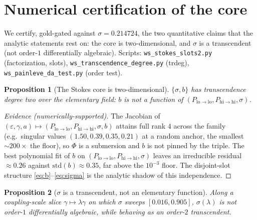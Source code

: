 \documentclass[11pt]{article}
\newtheorem{proposition}{Proposition}
\theoremstyle{definition}
\theoremstyle{remark}
\newcommand{\eps}{\varepsilon}
\newcommand{\lo}{\mathrm{lo}}
\newcommand{\hi}{\mathrm{hi}}
\begin{document}
\section{Numerical certification of the core}\label{sec:cert}

We certify, gold-gated against $\sigma=0.214724$, the two quantitative claims that the
analytic statements rest on: the core is two-dimensional, and $\sigma$ is a transcendent (not
order-$1$ differentially algebraic). Scripts: \texttt{ws\_stokes\_slots2.py} (factorization,
slots), \texttt{ws\_transcendence\_degree.py} (trdeg), \texttt{ws\_painleve\_da\_test.py}
(order test).

\begin{proposition}[The Stokes core is two-dimensional]\label{prop:trdeg}
$\{\sigma,b\}$ has transcendence degree two over the elementary field: $b$ is not a function
of $(P_{\lo\to\lo},P_{\hi\to\hi},\sigma)$.
\end{proposition}

\begin{proof}[Evidence (numerically-supported)]
The Jacobian of $(\eps,\gamma,a)\mapsto(P_{\lo\to\lo},P_{\hi\to\hi},\sigma,b)$ attains full
rank $4$ across the family (e.g.\ singular values $(1.50,0.39,0.35,0.21)$ at a random anchor,
the smallest $\sim200\times$ the floor), so $\Phi$ is a submersion and $b$ is not pinned by
the triple. The best polynomial fit of $b$ on $(P_{\lo\to\lo},P_{\hi\to\hi},\sigma)$ leaves an
irreducible residual $\approx0.26$ against $\mathrm{std}(b)\approx0.35$, far above the
$10^{-3}$ floor. The disjoint-slot structure \eqref{eq:b}--\eqref{eq:sigma} is the analytic
shadow of this independence.
\end{proof}

\begin{proposition}[$\sigma$ is a transcendent, not an elementary function]\label{prop:da}
Along a coupling-scale slice $\gamma\mapsto\lambda\gamma$ on which $\sigma$ sweeps
$[0.016,0.905]$, $\sigma(\lambda)$ is \emph{not} order-$1$ differentially algebraic, while
behaving as an order-$2$ transcendent.
\end{proposition}
\end{document}
